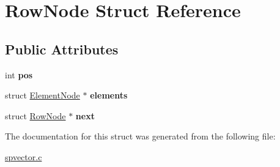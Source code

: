 \hypertarget{struct_row_node}{\section{Row\-Node Struct Reference}
\label{struct_row_node}
}
\subsection*{Public Attributes}
\begin{DoxyCompactItemize}
\item 
\hypertarget{struct_row_node_adfc9d5b92c7e9e6eb7adf65b97908658}{int {\bfseries pos}}\label{struct_row_node_adfc9d5b92c7e9e6eb7adf65b97908658}

\item 
\hypertarget{struct_row_node_a2df3f6f6d8eae01406fce8b2370a2e9e}{struct \hyperlink{struct_element_node}{Element\-Node} $\ast$ {\bfseries elements}}\label{struct_row_node_a2df3f6f6d8eae01406fce8b2370a2e9e}

\item 
\hypertarget{struct_row_node_af40c1426266f17f675ff2b3b110745a8}{struct \hyperlink{struct_row_node}{Row\-Node} $\ast$ {\bfseries next}}\label{struct_row_node_af40c1426266f17f675ff2b3b110745a8}

\end{DoxyCompactItemize}


The documentation for this struct was generated from the following file\-:\begin{DoxyCompactItemize}
\item 
\hyperlink{spvector_8c}{spvector.\-c}\end{DoxyCompactItemize}
